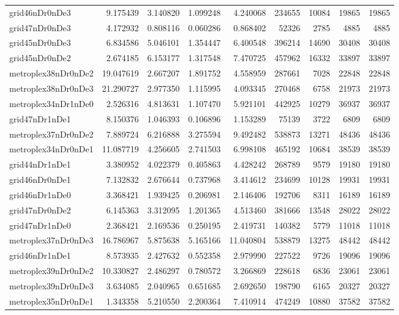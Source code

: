 \begin{longtable}{|l|r|r|r|r|r|r|r|r|}
grid46nDr0nDe3 & 9.175439 & 3.140820 & 1.099248 & 4.240068 & 234655 & 10084 & 19865 & 19865 \\
grid47nDr0nDe3 & 4.172932 & 0.808116 & 0.060286 & 0.868402 & 52326 & 2785 & 4885 & 4885 \\
grid45nDr0nDe3 & 6.834586 & 5.046101 & 1.354447 & 6.400548 & 396214 & 14690 & 30408 & 30408 \\
grid45nDr0nDe2 & 2.674185 & 6.153177 & 1.317548 & 7.470725 & 457962 & 16332 & 33897 & 33897 \\
metroplex38nDr0nDe2 & 19.047619 & 2.667207 & 1.891752 & 4.558959 & 287661 & 7028 & 22848 & 22848 \\
metroplex38nDr0nDe3 & 21.290727 & 2.977350 & 1.115995 & 4.093345 & 270468 & 6758 & 21973 & 21973 \\
metroplex34nDr1nDe0 & 2.526316 & 4.813631 & 1.107470 & 5.921101 & 442925 & 10279 & 36937 & 36937 \\
grid47nDr1nDe1 & 8.150376 & 1.046393 & 0.106896 & 1.153289 & 75139 & 3722 & 6809 & 6809 \\
metroplex37nDr0nDe2 & 7.889724 & 6.216888 & 3.275594 & 9.492482 & 538873 & 13271 & 48436 & 48436 \\
metroplex34nDr0nDe1 & 11.087719 & 4.256605 & 2.741503 & 6.998108 & 465192 & 10684 & 38539 & 38539 \\
grid44nDr1nDe1 & 3.380952 & 4.022379 & 0.405863 & 4.428242 & 268789 & 9579 & 19180 & 19180 \\
grid46nDr0nDe1 & 7.132832 & 2.676644 & 0.737968 & 3.414612 & 234699 & 10128 & 19931 & 19931 \\
grid46nDr1nDe0 & 3.368421 & 1.939425 & 0.206981 & 2.146406 & 192706 & 8311 & 16189 & 16189 \\
grid47nDr0nDe2 & 6.145363 & 3.312095 & 1.201365 & 4.513460 & 381666 & 13548 & 28022 & 28022 \\
grid47nDr1nDe0 & 2.368421 & 2.169536 & 0.250195 & 2.419731 & 140382 & 5779 & 11018 & 11018 \\
metroplex37nDr0nDe3 & 16.786967 & 5.875638 & 5.165166 & 11.040804 & 538879 & 13275 & 48442 & 48442 \\
grid46nDr1nDe1 & 8.573935 & 2.427632 & 0.552358 & 2.979990 & 227522 & 9726 & 19096 & 19096 \\
metroplex39nDr0nDe2 & 10.330827 & 2.486297 & 0.780572 & 3.266869 & 228618 & 6836 & 23061 & 23061 \\
metroplex39nDr0nDe3 & 3.634085 & 2.040965 & 0.651685 & 2.692650 & 198790 & 6165 & 20327 & 20327 \\
metroplex35nDr0nDe1 & 1.343358 & 5.210550 & 2.200364 & 7.410914 & 474249 & 10880 & 37582 & 37582 \\

\end{longtable}
